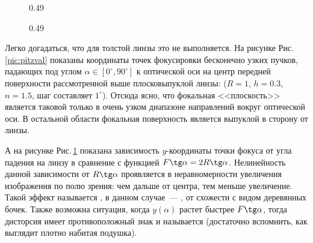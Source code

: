 \begin{figure}[h]
\begin{subcaptionblock}{0.49\tw}
		\caption{}
		\label{pic:pitzval}
	\end{subcaptionblock}
	\hfill
	\begin{subcaptionblock}{0.49\tw}
		\caption{}
		\label{pic:distorsion-y}
	\end{subcaptionblock}
	\caption{}
	
\end{figure}


Легко догадаться, что для толстой линзы это не выполняется. На рисунке Рис.\,\ref{pic:pitzval} показаны координаты точек фокусировки бесконечно узких пучков, падающих под углом $\alpha \in [0^\circ, 90^\circ]$ к оптической оси на центр передней поверхности рассмотренной выше плосковыпуклой линзы: ($R = 1$, $h = 0.3$, $n=1.5$, шаг составляет $1^\circ$). Отсюда ясно, что фокальная <<плоскость>> является таковой только в очень узком диапазоне направлений вокруг оптической оси. В остальной области фокальная поверхность является выпуклой в сторону от линзы.

  А на рисунке Рис.\,\ref{pic:distorsion-y} показана зависимость $y$-координаты точки фокуса от угла падения на линзу в сравнение с функцией $F \tg \alpha = 2R \tg \alpha$. Нелинейность данной зависимости от $R \tg \alpha$ проявляется в неравномерности увеличения изображения по полю зрения: чем дальше от центра, тем меньше увеличение. Такой эффект называется , в данном случае~--- , от схожести с видом деревянных бочек. Также возможна ситуация, когда $y(\alpha)$ растет быстрее $F \tg \alpha$, тогда дисторсия имеет противоположный знак и называется  (достаточно вспомнить, как выглядит плотно набитая подушка).
  
